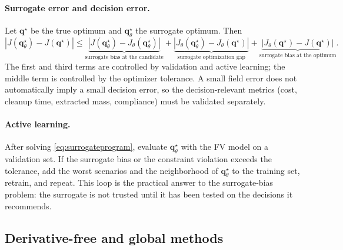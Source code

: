 \documentclass[11pt]{article}
\numberwithin{equation}{section}
\newcommand{\abs}[1]{\left\lvert #1 \right\rvert}
\theoremstyle{plain}
\begin{document}
\paragraph{Surrogate error and decision error.}
Let $\mathbf{q}^\star$ be the true optimum and $\mathbf{q}_\theta^\star$ the
surrogate optimum.  Then
\begin{equation}
\label{eq:decisionerror}
\abs{J(\mathbf{q}_\theta^\star)-J(\mathbf{q}^\star)}
\le
\underbrace{\abs{J(\mathbf{q}_\theta^\star)-J_\theta(\mathbf{q}_\theta^\star)}}_{\text{surrogate bias at the candidate}}
+\underbrace{\abs{J_\theta(\mathbf{q}_\theta^\star)-J_\theta(\mathbf{q}^\star)}}_{\text{surrogate optimization gap}}
+\underbrace{\abs{J_\theta(\mathbf{q}^\star)-J(\mathbf{q}^\star)}}_{\text{surrogate bias at the optimum}}.
\end{equation}
The first and third terms are controlled by validation and active learning; the
middle term is controlled by the optimizer tolerance.  A small field error
does not automatically imply a small decision error, so the decision-relevant
metrics (cost, cleanup time, extracted mass, compliance) must be validated
separately.

\paragraph{Active learning.}
After solving \eqref{eq:surrogateprogram}, evaluate $\mathbf{q}_\theta^\star$
with the FV model on a validation set.  If the surrogate bias or the constraint
violation exceeds the tolerance, add the worst scenarios and the neighborhood
of $\mathbf{q}_\theta^\star$ to the training set, retrain, and repeat.  This
loop is the practical answer to the surrogate-bias problem: the surrogate is
not trusted until it has been tested on the decisions it recommends.

\subsection{Derivative-free and global methods}
\end{document}
